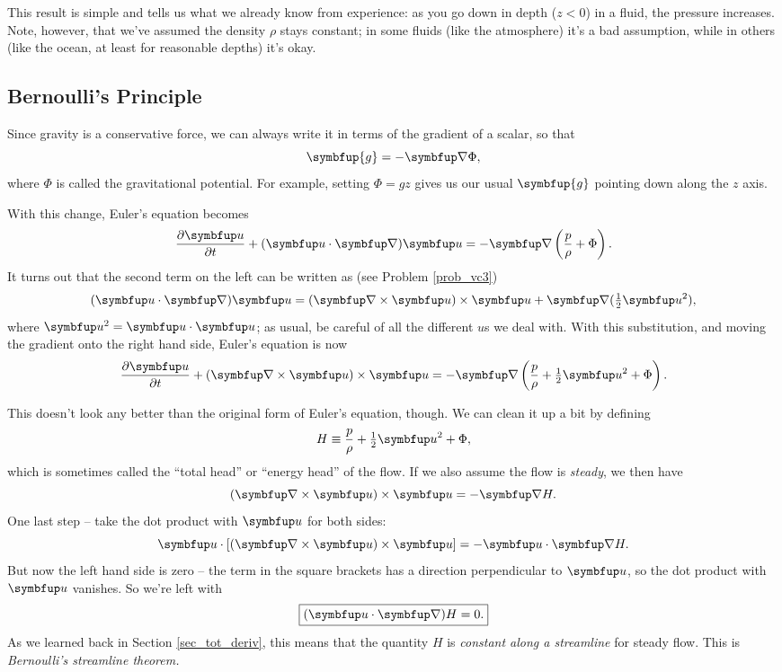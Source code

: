 This result is simple and tells us what we already know from experience:  as you go down in depth ($z < 0$) in a fluid, the pressure increases.  Note, however, that we've assumed the density $\rho$ stays constant; in some fluids (like the atmosphere) it's a bad assumption, while in others (like the ocean, at least for reasonable depths) it's okay.




\subsection{Bernoulli's Principle}

Since gravity is a conservative force, we can always write it in terms of the gradient of a scalar, so that
\[
\symbfup{g} = - \grad \Phi,
\]
where $\Phi$ is called the gravitational potential.  For example, setting $\Phi = gz$ gives us our usual $\symbfup{g}$ pointing down along the $z$ axis.

With this change, Euler's equation becomes
\begin{equation}
\frac{\partial \uu}{\partial t} + (\uu \cdot \grad) \uu = -\grad \left( \frac{p}{\rho} + \Phi \right).
\label{eq_euler_bern}
\end{equation}
It turns out that the second term on the left can be written as (see Problem \ref{prob_vc3})
\begin{equation}
 (\uu \cdot \grad) \uu = (\curl \uu ) \times \uu + \grad (\tfrac{1}{2} \uu^2),
\end{equation}
where $\uu^2 = \uu \cdot \uu$; as usual, be careful of all the different $u$s we deal with.  With this substitution, and moving the gradient onto the right hand side, Euler's equation is now
\begin{equation}
\label{eq_euler_bernoulli}
\frac{\partial \uu}{\partial t} + (\curl \uu ) \times \uu = -\grad \left( \frac{p}{\rho} + \tfrac{1}{2} \uu^2 + \Phi \right).
\end{equation}

This doesn't look any better than the original form of Euler's equation, though.  We can clean it up a bit by defining
\[
H \equiv \frac{p}{\rho} + \tfrac{1}{2} \uu^2 + \Phi,
\]
which is sometimes called the ``total head'' or ``energy head'' of the flow.  If we also assume the flow is \emph{steady}, we then have
\begin{equation}
(\curl \uu ) \times \uu = -\grad H.
\label{eq_bernoulli}
\end{equation}
One last step -- take the dot product with $\uu$ for both sides:
\[
\uu \cdot [(\curl \uu ) \times \uu] = -\uu \cdot \grad H.
\]
But now the left hand side is zero -- the term in the square brackets has a direction perpendicular to $\uu$, so the dot product with $\uu$ vanishes.  So we're left with
\begin{equation}
\boxed{
(\uu \cdot \grad) H  = 0.
}
\end{equation}
As we learned back in Section \ref{sec_tot_deriv}, this means that the quantity $H$ is \emph{constant along a streamline} for steady flow.  This is \emph{Bernoulli's streamline theorem.}

